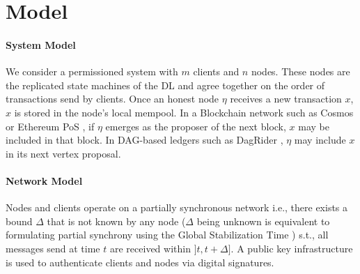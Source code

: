 

\section{Model\label{sec:prel}}


\paragraph{System Model}
We consider a permissioned system with $m$ clients and $n$ nodes.
These nodes are the replicated state machines of the DL and agree together on the order of transactions send by clients.
Once an honest node $\eta$ receives a new transaction $x$, $x$ is stored in the node's local mempool.
In a Blockchain network such as Cosmos \cite{dissecting_tendermint} or Ethereum PoS \cite{exploiting_ethereum_after_the_merge_the_interplay_between_pos_and_mev_strategies}, if $\eta$ emerges as the proposer of the next block, $x$ may be included in that block.
In DAG-based ledgers such as DagRider \cite{all_you_need_is_dag}, $\eta$ may include $x$ in its next vertex proposal.



\paragraph{Network Model}
Nodes and clients operate on a partially synchronous network \cite{consensus_in_the_presence_of_partial_synchrony} i.e., there exists a bound $\Delta$ that is not known by any node ($\Delta$ being unknown is equivalent to formulating partial synchrony using the Global Stabilization Time \cite{consensus_in_the_presence_of_partial_synchrony,themis_fast_strong_order_fairness_in_byzantine_consensus}) s.t., all messages send at time $t$ are received within $]t,t+\Delta]$.
A public key infrastructure is used to authenticate clients and nodes via digital signatures.



